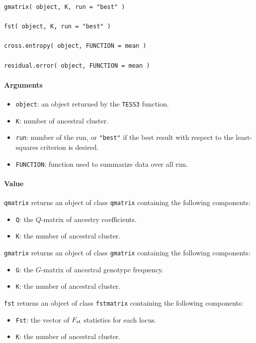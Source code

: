 \documentclass[10pt,a4paper]{article}
\begin{document}
\begin{itemize}
\begin{Verbatim}
gmatrix( object, K, run = "best" )
  
fst( object, K, run = "best" )
  
cross.entropy( object, FUNCTION = mean ) 

residual.error( object, FUNCTION = mean )

\end{Verbatim}
\paragraph{Arguments}
\begin{itemize}
\item \verb|object|: an object returned by the \verb|TESS3| function.
\item \verb|K|: number of ancestral cluster.
\item \verb|run|: number of the run, or \verb|"best"| if the best result with respect to the least-squares criterion is desired.
\item \verb|FUNCTION|: function used to summarize data over all run.

\end{itemize}

\paragraph{Value}
\verb|qmatrix| returns an object of class \verb|qmatrix| containing the following components: 

\begin{itemize}
\item \verb|Q|: the $Q$-matrix of ancestry coefficients.
\item \verb|K|: the number of ancestral cluster.
\end{itemize}

\verb|gmatrix| returns an object of class \verb|gmatrix| containing the following components: 

\begin{itemize}
\item \verb|G|: the $G$-matrix of ancestral genotype frequency.
\item \verb|K|: the number of ancestral cluster.
\end{itemize}

\verb|fst| returns an object of class \verb|fstmatrix| containing the following components: 

\begin{itemize}
\item \verb|Fst|: the vector of $F_{\rm st}$ statistics for each locus.
\item \verb|K|: the number of ancestral cluster.
\end{itemize}


\end{itemize}
\end{document}
